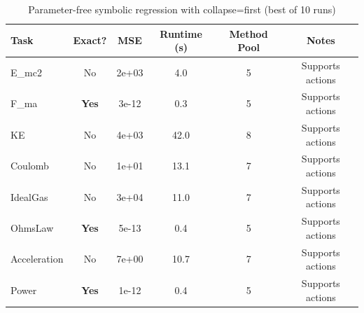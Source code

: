 \begin{table}[h]
\centering
\caption{Parameter-free symbolic regression with collapse=first (best of 10 runs)}
\label{tab:baselines_first}
\begin{tabular}{lccccc}
\toprule
Task & Exact? & MSE & Runtime (s) & Method Pool & Notes \\
\midrule
E_mc2 & No & 2e+03 & 4.0 & 5 & Supports actions \\
\midrule
F_ma & \textbf{Yes} & 3e-12 & 0.3 & 5 & Supports actions \\
\midrule
KE & No & 4e+03 & 42.0 & 8 & Supports actions \\
\midrule
Coulomb & No & 1e+01 & 13.1 & 7 & Supports actions \\
\midrule
IdealGas & No & 3e+04 & 11.0 & 7 & Supports actions \\
\midrule
OhmsLaw & \textbf{Yes} & 5e-13 & 0.4 & 5 & Supports actions \\
\midrule
Acceleration & No & 7e+00 & 10.7 & 7 & Supports actions \\
\midrule
Power & \textbf{Yes} & 1e-12 & 0.4 & 5 & Supports actions \\
\midrule
\bottomrule
\end{tabular}
\end{table}